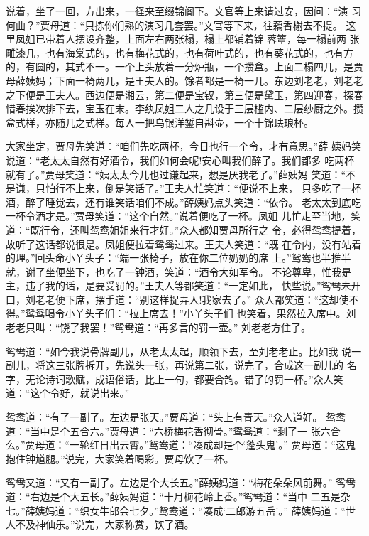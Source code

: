说着，坐了一回，方出来，一径来至缀锦阁下。文官等上来请过安，因问：“演
习何曲？”贾母道：“只拣你们熟的演习几套罢。”文官等下来，往藕香榭去不提。
这里凤姐已带着人摆设齐整，上面左右两张榻，榻上都铺着锦蓉簟，每一榻前两
张雕漆几，也有海棠式的，也有梅花式的，也有荷叶式的，也有葵花式的，也有方
的，有圆的，其式不一。一个上头放着一分炉瓶，一个攒盒。上面二榻四几，是贾
母薛姨妈；下面一椅两几，是王夫人的。馀者都是一椅一几。东边刘老老，刘老老
之下便是王夫人。西边便是湘云，第二便是宝钗，第三便是黛玉，第四迎春，探春
惜春挨次排下去，宝玉在末。李纨凤姐二人之几设于三层槛内、二层纱厨之外。攒
盒式样，亦随几之式样。每人一把乌银洋錾自斟壶，一个十锦珐琅杯。

大家坐定，贾母先笑道：“咱们先吃两杯，今日也行一个令，才有意思。”薛
姨妈笑说道：“老太太自然有好酒令，我们如何会呢!安心叫我们醉了。我们都多
吃两杯就有了。”贾母笑道：“姨太太今儿也过谦起来，想是厌我老了。”薛姨妈
笑道：“不是谦，只怕行不上来，倒是笑话了。”王夫人忙笑道：“便说不上来，
只多吃了一杯酒，醉了睡觉去，还有谁笑话咱们不成。”薛姨妈点头笑道：“依令。
老太太到底吃一杯令酒才是。”贾母笑道：“这个自然。”说着便吃了一杯。凤姐
儿忙走至当地，笑道：“既行令，还叫鸳鸯姐姐来行才好。”众人都知贾母所行之
令，必得鸳鸯提着，故听了这话都说很是。凤姐便拉着鸳鸯过来。王夫人笑道：“既
在令内，没有站着的理。”回头命小丫头子：“端一张椅子，放在你二位奶奶的席
上。”鸳鸯也半推半就，谢了坐便坐下，也吃了一钟酒，笑道：“酒令大如军令。
不论尊卑，惟我是主，违了我的话，是要受罚的。”王夫人等都笑道：“一定如此，
快些说。”鸳鸯未开口，刘老老便下席，摆手道：“别这样捉弄人!我家去了。”
众人都笑道：“这却使不得。”鸳鸯喝令小丫头子们：“拉上席去！”小丫头子们
也笑着，果然拉入席中。刘老老只叫：“饶了我罢！”鸳鸯道：“再多言的罚一壶。”
刘老老方住了。

鸳鸯道：“如今我说骨牌副儿，从老太太起，顺领下去，至刘老老止。比如我
说一副儿，将这三张牌拆开，先说头一张，再说第二张，说完了，合成这一副儿的
名字，无论诗词歌赋，成语俗话，比上一句，都要合韵。错了的罚一杯。”众人笑
道：“这个令好，就说出来。”

鸳鸯道：“有了一副了。左边是张天。”贾母道：“头上有青天。”众人道好。
鸳鸯道：“当中是个五合六。”贾母道：“六桥梅花香彻骨。”鸳鸯道：“剩了一
张六合么。”贾母道：“一轮红日出云霄。”鸳鸯道：“凑成却是个‘蓬头鬼’。”
贾母道：“这鬼抱住钟馗腿。”说完，大家笑着喝彩。贾母饮了一杯。

鸳鸯又道：“又有一副了。左边是个大长五。”薛姨妈道：“梅花朵朵风前舞。”
鸳鸯道：“右边是个大五长。”薛姨妈道：“十月梅花岭上香。”鸳鸯道：“当中
二五是杂七。”薛姨妈道：“织女牛郎会七夕。”鸳鸯道：“凑成‘二郎游五岳’。”
薛姨妈道：“世人不及神仙乐。”说完，大家称赏，饮了酒。

